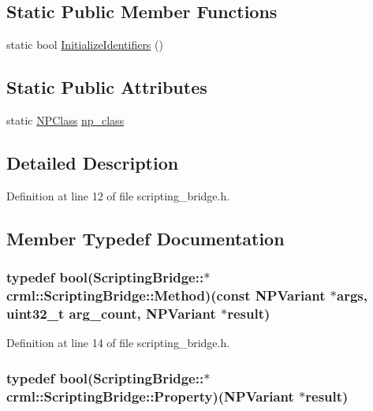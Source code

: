 \subsection*{Static Public Member Functions}
\begin{DoxyCompactItemize}
\item 
static bool \hyperlink{classcrml_1_1_scripting_bridge_a578877afcfdf32ca1330732bbf6739ad}{InitializeIdentifiers} ()
\end{DoxyCompactItemize}
\subsection*{Static Public Attributes}
\begin{DoxyCompactItemize}
\item 
static \hyperlink{struct_n_p_class}{NPClass} \hyperlink{classcrml_1_1_scripting_bridge_a1a005096b44959f11d3759a6c3540534}{np\_\-class}
\end{DoxyCompactItemize}


\subsection{Detailed Description}


Definition at line 12 of file scripting\_\-bridge.h.



\subsection{Member Typedef Documentation}
\hypertarget{classcrml_1_1_scripting_bridge_a914d759a85c8280e66b435b824c6f06e}{
\subsubsection[{Method}]{\setlength{\rightskip}{0pt plus 5cm}typedef bool(ScriptingBridge::$\ast$ {\bf crml::ScriptingBridge::Method})(const {\bf NPVariant} $\ast$args, uint32\_\-t arg\_\-count, {\bf NPVariant} $\ast$result)}}
\label{classcrml_1_1_scripting_bridge_a914d759a85c8280e66b435b824c6f06e}


Definition at line 14 of file scripting\_\-bridge.h.

\hypertarget{classcrml_1_1_scripting_bridge_a784ee1ef915801e5c5facde3d6c70aef}{
\subsubsection[{Property}]{\setlength{\rightskip}{0pt plus 5cm}typedef bool(ScriptingBridge::$\ast$ {\bf crml::ScriptingBridge::Property})({\bf NPVariant} $\ast$result)}}
\label{classcrml_1_1_scripting_bridge_a784ee1ef915801e5c5facde3d6c70aef}


